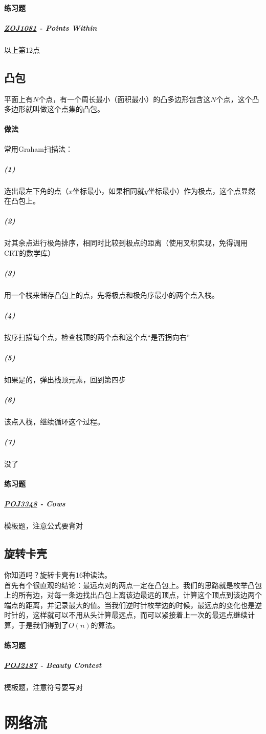 \documentclass[]{cpp}
\begin{document}
\paragraph{练习题}
\subparagraph{\href{http://acm.zju.edu.cn/onlinejudge/showProblem.do?problemCode=1081}{ZOJ1081} - Points Within} 以上第12点
\subsection{凸包} 平面上有$N$个点，有一个周长最小（面积最小）的凸多边形包含这$N$个点，这个凸多边形就叫做这个点集的凸包。
\paragraph{做法} 常用Graham扫描法：
\subparagraph{(1)} 选出最左下角的点（$x$坐标最小，如果相同就$y$坐标最小）作为极点，这个点显然在凸包上。
\subparagraph{(2)} 对其余点进行极角排序，相同时比较到极点的距离（使用叉积实现，免得调用CRT的数学库）
\subparagraph{(3)} 用一个栈来储存凸包上的点，先将极点和极角序最小的两个点入栈。
\subparagraph{(4)} 按序扫描每个点，检查栈顶的两个点和这个点“是否拐向右”
\subparagraph{(5)} 如果是的，弹出栈顶元素，回到第四步
\subparagraph{(6)} 该点入栈，继续循环这个过程。
\subparagraph{(7)} 没了
\paragraph{练习题}
\subparagraph{\href{http://poj.org/problem?id=3348}{POJ3348} - Cows} 模板题，注意公式要背对
\subsection{旋转卡壳} 你知道吗？旋转卡壳有16种读法。\\
	首先有个很直观的结论：最远点对的两点一定在凸包上。我们的思路就是枚举凸包上的所有边，对每一条边找出凸包上离该边最远的顶点，计算这个顶点到该边两个端点的距离，并记录最大的值。当我们逆时针枚举边的时候，最远点的变化也是逆时针的，这样就可以不用从头计算最远点，而可以紧接着上一次的最远点继续计算，于是我们得到了$O(n)$的算法。
\paragraph{练习题}
\subparagraph{\href{http://poj.org/problem?id=2187}{POJ2187} - Beauty Contest} 模板题，注意符号要写对
\section{网络流}
\end{document}
